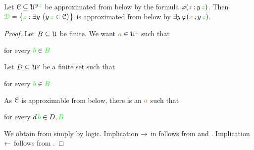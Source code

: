 % 
% 
% 
% 
% 
% 
% 
% 
% 

\begin{proposition}\label{prop_sh_exp_qe}
Let $\EuScript C\subseteq\EuScript U^{y\,{\color{green} z}}$ be approximated from below by the formula $\varphi({\color{brown} x}\,;y\,{\color{green} z})$.
Then ${\color{green}\EuScript D}=\big\{{\color{green} z}:\exists y\ \big(y\,{\color{green} z}\in\EuScript C\big)\big\}$ is approximated from below by $\exists y\,\varphi({\color{brown} x}\,;y\,{\color{green} z})$.
\end{proposition}

\begin{proof}
Let $B\subseteq\EuScript U$ be finite.
We want ${\color{brown} a}\in\EuScript U^{\color{brown} x}$ such that

\hfill for every ${\color{green} b}\in{\color{green}B}$


Let $D\subseteq\EuScript U^y$ be a finite set such that 

\hfill for every ${\color{green} b}\in{\color{green}B}$

As $\EuScript C$ is approximable from below, there is an ${\color{brown} a}$ such that

\hfill for every $d\,{\color{green} b}\in D,{\color{green} B}$


We obtain  from  simply by logic.
Implication $\rightarrow$ in  follows from  and .
Implication $\leftarrow$ follows from .
\end{proof}

